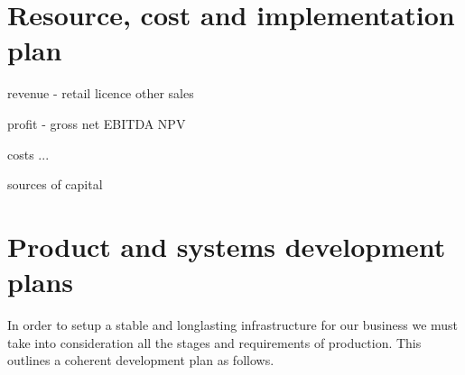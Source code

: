 \documentclass{article}
\begin{document}
\section{Resource, cost and implementation plan}
revenue
 - retail
   licence
   other sales

profit
 - gross
   net
   EBITDA
   NPV

costs
 ...

sources of capital
\section{Product and systems development plans}
In order to setup a stable and longlasting infrastructure for our business we must take into consideration all the stages and requirements of production. This outlines a coherent development plan as follows.
\end{document}
